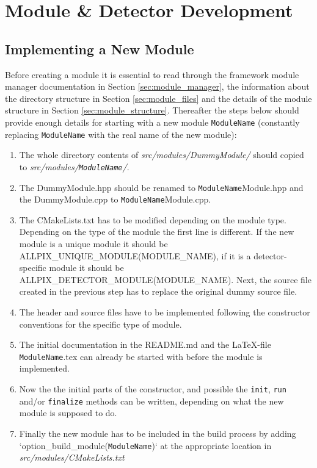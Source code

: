 \section{Module \& Detector Development}
\subsection{Implementing a New Module}
\label{sec:building_new_module}
Before creating a module it is essential to read through the framework module manager documentation in Section \ref{sec:module_manager}, the information about the directory structure in Section \ref{sec:module_files} and the details of the module structure in Section \ref{sec:module_structure}. Thereafter the steps below should provide enough details for starting with a new module \texttt{ModuleName} (constantly replacing  \texttt{ModuleName} with the real name of the new module):
\begin{enumerate}
\item The whole directory contents of \textit{src/modules/DummyModule/} should copied to \textit{src/modules/\texttt{ModuleName}/}.
\item The DummyModule.hpp should be renamed to \texttt{ModuleName}Module.hpp and the DummyModule.cpp to \texttt{ModuleName}Module.cpp.
\item The CMakeLists.txt has to be modified depending on the module type. Depending on the type of the module the first line is different. If the new module is a unique module it should be ALLPIX\_UNIQUE\_MODULE(MODULE\_NAME), if it is a detector-specific module it should be ALLPIX\_DETECTOR\_MODULE(MODULE\_NAME). Next, the source file created in the previous step has to replace the original dummy source file.
\item The header and source files have to be implemented following the constructor conventions for the specific type of module.
\item The initial documentation in the README.md and the \LaTeX-file \texttt{ModuleName}.tex can already be started with before the module is implemented.
\item Now the the initial parts of the constructor, and possible the \texttt{init}, \texttt{run} and/or \texttt{finalize} methods can be written, depending on what the new module is supposed to do.
\item Finally the new module has to be included in the build process by adding `option\_build\_module(\texttt{ModuleName})` at the appropriate location in \textit{src/modules/CMakeLists.txt}
\end{enumerate}

